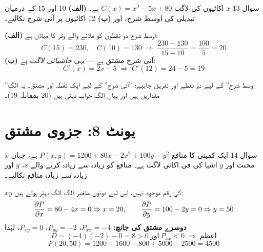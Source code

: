 \begin{sawal}{سوال \textenglish{13}}
\(x\) اکائیوں کی لاگت \(C(x)=x^{2}-5x+80\) ہے۔ \textbf{(الف)} \textenglish{10}
اور \textenglish{15} کے درمیان تبدیلی کی اوسط شرح، اور \textbf{(ب)}
\textenglish{12} اکائیوں پر آنی شرح نکالیے۔
\end{sawal}

\begin{hal}
\textbf{(الف)} اوسط شرح دو نقطوں کو ملانے والے وتر کا میلان ہے:
\[
C(15)=230,\quad C(10)=130
\;\Longrightarrow\;
\frac{230-130}{15-10}=\frac{100}{5}=20
\]
\textbf{(ب)} آنی شرح مشتق ہے --- یہی \emph{حاشیائی لاگت} ہے:
\[
C'(x)=2x-5 \;\Longrightarrow\; C'(12)=24-5=19
\]

\end{hal}

\begin{ghalti}
''اوسط شرح'' کے لیے دو نقطے اور تفریق چاہیے؛ ''آنی شرح'' کے لیے ایک نقطہ اور
مشتق۔ یہ الگ مقداریں ہیں اور یہاں الگ جواب دیتی ہیں (\(20\) بمقابلہ \(19\))۔
\end{ghalti}

\section*{یونٹ \textenglish{8}: جزوی مشتق}

\begin{sawal}{سوال \textenglish{14}}
ایک کمپنی کا منافع \(P(x,y)=1200+80x-2x^{2}+100y-y^{2}\) ہے، جہاں \(x\) محنت اور
\(y\) اشیا کی فی اکائی لاگت ہے۔ منافع کو زیادہ سے زیادہ کرنے والے \(x\)، \(y\)
اور زیادہ سے زیادہ منافع نکالیے۔
\end{sawal}

\begin{hal}
\(xy\) کی رقم موجود نہیں، اس لیے دونوں متغیر الگ الگ بہتر ہوتے ہیں:
\[
\frac{\partial P}{\partial x}=80-4x=0 \Rightarrow x=20,
\qquad
\frac{\partial P}{\partial y}=100-2y=0 \Rightarrow y=50
\]
\textbf{دوسرے مشتق کی جانچ:} \(P_{xx}=-4\)، \(P_{yy}=-2\)، \(P_{xy}=0\)، لہٰذا
\[
D=(-4)(-2)-0=8>0 \ \text{اور}\ P_{xx}<0 \;\Longrightarrow\; \text{اعظم}
\]
\[
P(20,50)=1200+1600-800+5000-2500=4500
\]

\end{hal}

